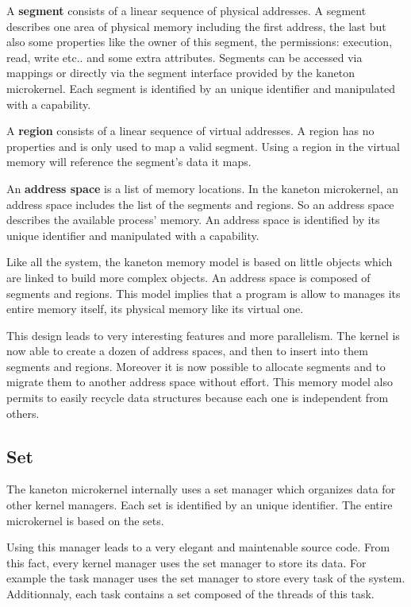 \documentclass[10pt,a4wide]{article}
\begin{document}
\begin{multicols}{2}
A \textbf{segment} consists of a linear sequence of physical addresses.
A segment describes one area of physical memory including the
first address, the last but also some properties like the owner of this
segment, the permissions: execution, read, write etc.. and some
extra attributes. Segments can be accessed via mappings or directly via
the segment interface provided by the kaneton microkernel. Each segment
is identified by an unique identifier and manipulated with a capability.

A \textbf{region} consists of a linear sequence of virtual addresses.
A region has no properties and is only used to map a valid segment.
Using a region in the virtual memory will reference the segment's data
it maps.

An \textbf{address space} is a list of memory locations. In the kaneton
microkernel, an address space includes the list of the segments and regions.
So an address space describes the available process' memory. An address space
is identified by its unique identifier and manipulated with a capability.

Like all the system, the kaneton memory model is based on little objects which
are linked to build more complex objects. An address space is composed
of segments and regions. This model implies that a program is allow to
manages its entire memory itself, its physical memory like its virtual one.

This design leads to very interesting features and more parallelism.
The kernel is now able to create a dozen of address spaces, and then to
insert into them segments and regions. Moreover it is now possible to allocate
segments and to migrate them to another address space without effort. This
memory model also permits to easily recycle data structures because each one
is independent from others.

\subsection{Set}

The kaneton microkernel internally uses a set manager which organizes data
for other kernel managers. Each set is identified by an unique identifier.
The entire microkernel is based on the sets.

Using this manager leads to a very elegant and maintenable source code. From
this fact, every kernel manager uses the set manager to store its data. For
example the task manager uses the set manager to store every task of the
system. Additionnaly, each task contains a set composed of the threads of
this task.


\end{multicols}
\end{document}
